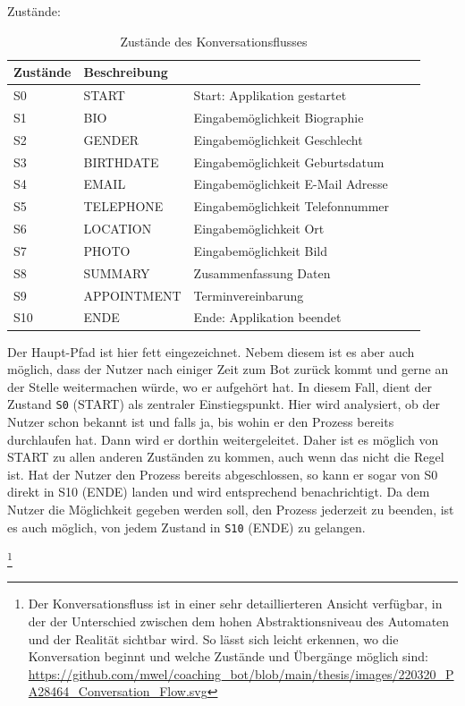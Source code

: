 	Zustände:
	\begin{table} %
		\centering
		\begin{tabular}{l | l l l l}
			\textbf{Zustände} 	& \textbf{Beschreibung}\\
			\hline
			S0 					&		 START 			&		 Start: Applikation gestartet\\
			S1 					&		 BIO 			&		 Eingabemöglichkeit Biographie\\
			S2 					&		 GENDER 		&		 Eingabemöglichkeit Geschlecht\\
			S3 					&		 BIRTHDATE 		&		 Eingabemöglichkeit Geburtsdatum\\
			S4 					&		 EMAIL 			&		 Eingabemöglichkeit E-Mail Adresse\\
			S5 					&		 TELEPHONE 		&		 Eingabemöglichkeit Telefonnummer\\
			S6 					&		 LOCATION 		&		 Eingabemöglichkeit Ort\\
			S7 					&		 PHOTO 			&		 Eingabemöglichkeit Bild\\
			S8 					&		 SUMMARY 		&		 Zusammenfassung Daten\\
			S9 					&		 APPOINTMENT	&		 Terminvereinbarung \\
			S10 				&		 ENDE 			&		 Ende: Applikation beendet\\

		\end{tabular}
		\caption{Zustände des Konversationsflusses}
		\label{tab: states}
	\end{table}

	Der Haupt-Pfad ist hier fett eingezeichnet. Nebem diesem ist es aber auch möglich, dass der Nutzer nach einiger Zeit zum Bot zurück kommt und gerne an der Stelle weitermachen würde, wo er aufgehört hat. In diesem Fall, dient der Zustand \verb|S0| (START) als zentraler Einstiegspunkt. Hier wird analysiert, ob der Nutzer schon bekannt ist und falls ja, bis wohin er den Prozess bereits durchlaufen hat. Dann wird er dorthin weitergeleitet. Daher ist es möglich von START zu allen anderen Zuständen zu kommen, auch wenn das nicht die Regel ist. Hat der Nutzer den Prozess bereits abgeschlossen, so kann er sogar von S0 direkt in S10 (ENDE) landen und wird entsprechend benachrichtigt. Da dem Nutzer die Möglichkeit gegeben werden soll, den Prozess jederzeit zu beenden, ist es auch möglich, von jedem Zustand in \verb|S10| (ENDE) zu gelangen.
	
	\footnote{Der Konversationsfluss ist in einer sehr detaillierteren Ansicht verfügbar, in der der Unterschied zwischen dem hohen Abstraktionsniveau des Automaten und der Realität sichtbar wird. So lässt sich leicht erkennen, wo die Konversation beginnt und welche Zustände und Übergänge möglich sind: \url{https://github.com/mwel/coaching_bot/blob/main/thesis/images/220320_PA28464_Conversation_Flow.svg}} 